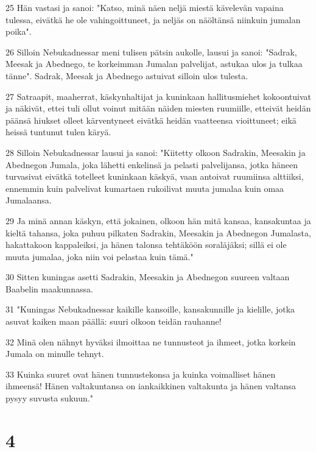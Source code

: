 \par 25 Hän vastasi ja sanoi: "Katso, minä näen neljä miestä kävelevän vapaina tulessa, eivätkä he ole vahingoittuneet, ja neljäs on näöltänsä niinkuin jumalan poika".
\par 26 Silloin Nebukadnessar meni tulisen pätsin aukolle, lausui ja sanoi: "Sadrak, Meesak ja Abednego, te korkeimman Jumalan palvelijat, astukaa ulos ja tulkaa tänne". Sadrak, Meesak ja Abednego astuivat silloin ulos tulesta.
\par 27 Satraapit, maaherrat, käskynhaltijat ja kuninkaan hallitusmiehet kokoontuivat ja näkivät, ettei tuli ollut voinut mitään näiden miesten ruumiille, etteivät heidän päänsä hiukset olleet kärventyneet eivätkä heidän vaatteensa vioittuneet; eikä heissä tuntunut tulen käryä.
\par 28 Silloin Nebukadnessar lausui ja sanoi: "Kiitetty olkoon Sadrakin, Meesakin ja Abednegon Jumala, joka lähetti enkelinsä ja pelasti palvelijansa, jotka häneen turvasivat eivätkä totelleet kuninkaan käskyä, vaan antoivat ruumiinsa alttiiksi, ennemmin kuin palvelivat kumartaen rukoilivat muuta jumalaa kuin omaa Jumalaansa.
\par 29 Ja minä annan käskyn, että jokainen, olkoon hän mitä kansaa, kansakuntaa ja kieltä tahansa, joka puhuu pilkaten Sadrakin, Meesakin ja Abednegon Jumalasta, hakattakoon kappaleiksi, ja hänen talonsa tehtäköön soraläjäksi; sillä ei ole muuta jumalaa, joka niin voi pelastaa kuin tämä."
\par 30 Sitten kuningas asetti Sadrakin, Meesakin ja Abednegon suureen valtaan Baabelin maakunnassa.
\par 31 "Kuningas Nebukadnessar kaikille kansoille, kansakunnille ja kielille, jotka asuvat kaiken maan päällä: suuri olkoon teidän rauhanne!
\par 32 Minä olen nähnyt hyväksi ilmoittaa ne tunnusteot ja ihmeet, jotka korkein Jumala on minulle tehnyt.
\par 33 Kuinka suuret ovat hänen tunnustekonsa ja kuinka voimalliset hänen ihmeensä! Hänen valtakuntansa on iankaikkinen valtakunta ja hänen valtansa pysyy suvusta sukuun."

\chapter{4}

